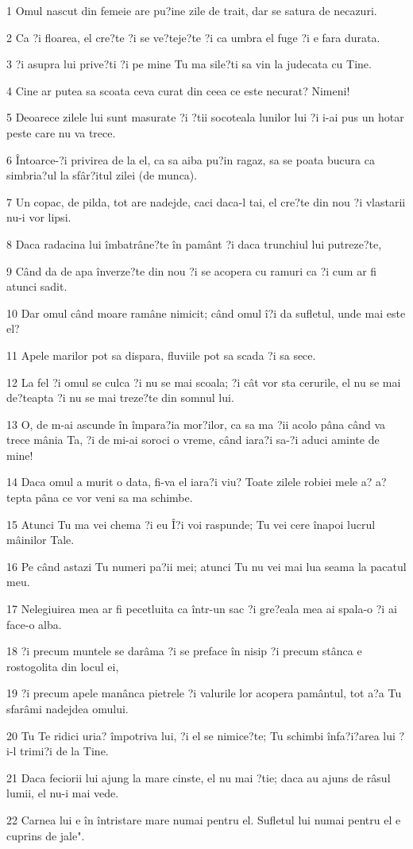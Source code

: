 \par 1 Omul nascut din femeie are pu?ine zile de trait, dar se satura de necazuri.
\par 2 Ca ?i floarea, el cre?te ?i se ve?teje?te ?i ca umbra el fuge ?i e fara durata.
\par 3 ?i asupra lui prive?ti ?i pe mine Tu ma sile?ti sa vin la judecata cu Tine.
\par 4 Cine ar putea sa scoata ceva curat din ceea ce este necurat? Nimeni!
\par 5 Deoarece zilele lui sunt masurate ?i ?tii socoteala lunilor lui ?i i-ai pus un hotar peste care nu va trece.
\par 6 Întoarce-?i privirea de la el, ca sa aiba pu?in ragaz, sa se poata bucura ca simbria?ul la sfâr?itul zilei (de munca).
\par 7 Un copac, de pilda, tot are nadejde, caci daca-l tai, el cre?te din nou ?i vlastarii nu-i vor lipsi.
\par 8 Daca radacina lui îmbatrâne?te în pamânt ?i daca trunchiul lui putreze?te,
\par 9 Când da de apa înverze?te din nou ?i se acopera cu ramuri ca ?i cum ar fi atunci sadit.
\par 10 Dar omul când moare ramâne nimicit; când omul î?i da sufletul, unde mai este el?
\par 11 Apele marilor pot sa dispara, fluviile pot sa scada ?i sa sece.
\par 12 La fel ?i omul se culca ?i nu se mai scoala; ?i cât vor sta cerurile, el nu se mai de?teapta ?i nu se mai treze?te din somnul lui.
\par 13 O, de m-ai ascunde în împara?ia mor?ilor, ca sa ma ?ii acolo pâna când va trece mânia Ta, ?i de mi-ai soroci o vreme, când iara?i sa-?i aduci aminte de mine!
\par 14 Daca omul a murit o data, fi-va el iara?i viu? Toate zilele robiei mele a? a?tepta pâna ce vor veni sa ma schimbe.
\par 15 Atunci Tu ma vei chema ?i eu Î?i voi raspunde; Tu vei cere înapoi lucrul mâinilor Tale.
\par 16 Pe când astazi Tu numeri pa?ii mei; atunci Tu nu vei mai lua seama la pacatul meu.
\par 17 Nelegiuirea mea ar fi pecetluita ca într-un sac ?i gre?eala mea ai spala-o ?i ai face-o alba.
\par 18 ?i precum muntele se darâma ?i se preface în nisip ?i precum stânca e rostogolita din locul ei,
\par 19 ?i precum apele manânca pietrele ?i valurile lor acopera pamântul, tot a?a Tu sfarâmi nadejdea omului.
\par 20 Tu Te ridici uria? împotriva lui, ?i el se nimice?te; Tu schimbi înfa?i?area lui ?i-l trimi?i de la Tine.
\par 21 Daca feciorii lui ajung la mare cinste, el nu mai ?tie; daca au ajuns de râsul lumii, el nu-i mai vede.
\par 22 Carnea lui e în întristare mare numai pentru el. Sufletul lui numai pentru el e cuprins de jale".

